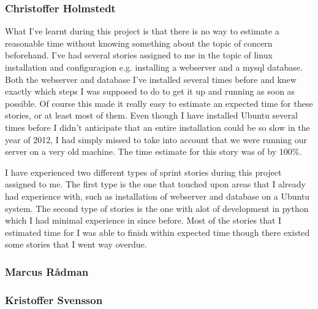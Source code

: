 \subsubsection{Christoffer Holmstedt}
What I've learnt during this project is that there is no way to estimate a reasonable time without knowing something about the topic of concern beforehand.
I've had several stories assigned to me in the topic of linux installation and configuragion e.g. installing a webserver and a mysql database.
Both the webserver and database I've installed several times before and knew exactly which steps I was supposed to do to get it up and running as soon as possible.
Of course this made it really easy to estimate an expected time for these stories, or at least most of them.
Even though I have installed Ubuntu several times before I didn't anticipate that an entire installation could be so slow in the year of 2012, I had simply missed to take into account that we were running our server on a very old machine.
The time estimate for this story was of by 100\%.


I have experienced two different types of sprint stories during this project assigned to me.
The first type is the one that touched upon areas that I already had experience with, such as installation of webserver and database on a Ubuntu system.
The second type of stories is the one with alot of development in python which I had minimal experience in since before.
Most of the stories that I estimated time for I was able to finish within expected time though there existed some stories that I went way overdue.
\subsubsection{Marcus Rådman}
\subsubsection{Kristoffer Svensson}
